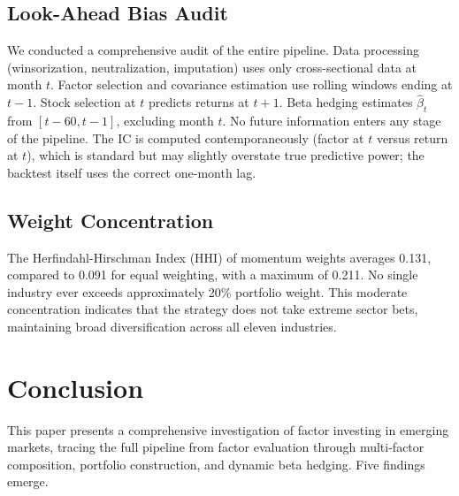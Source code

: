 \documentclass[12pt]{article}
\begin{document}
\subsection{Look-Ahead Bias Audit}

We conducted a comprehensive audit of the entire pipeline. Data processing (winsorization, neutralization, imputation) uses only cross-sectional data at month $t$. Factor selection and covariance estimation use rolling windows ending at $t{-}1$. Stock selection at $t$ predicts returns at $t{+}1$. Beta hedging estimates $\hat{\beta}_t$ from $[t{-}60, t{-}1]$, excluding month $t$. No future information enters any stage of the pipeline. The IC is computed contemporaneously (factor at $t$ versus return at $t$), which is standard but may slightly overstate true predictive power; the backtest itself uses the correct one-month lag.

\subsection{Weight Concentration}

The Herfindahl-Hirschman Index (HHI) of momentum weights averages 0.131, compared to 0.091 for equal weighting, with a maximum of 0.211. No single industry ever exceeds approximately 20\% portfolio weight. This moderate concentration indicates that the strategy does not take extreme sector bets, maintaining broad diversification across all eleven industries.


\section{Conclusion}

This paper presents a comprehensive investigation of factor investing in emerging markets, tracing the full pipeline from factor evaluation through multi-factor composition, portfolio construction, and dynamic beta hedging. Five findings emerge.
\end{document}
